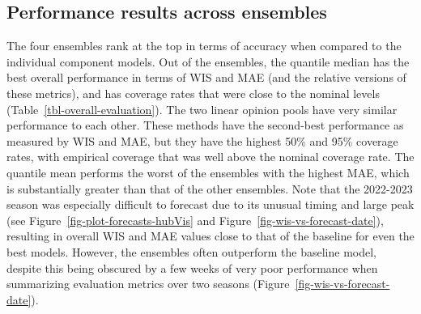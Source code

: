 \documentclass[
]{article}
\begin{document}
\subsection{Performance results across
ensembles}\label{performance-results-across-ensembles}

The four ensembles rank at the top in terms of accuracy when compared to
the individual component models. Out of the ensembles, the quantile
median has the best overall performance in terms of WIS and MAE (and the
relative versions of these metrics), and has coverage rates that were
close to the nominal levels (Table~\ref{tbl-overall-evaluation}). The
two linear opinion pools have very similar performance to each other.
These methods have the second-best performance as measured by WIS and
MAE, but they have the highest 50\% and 95\% coverage rates, with
empirical coverage that was well above the nominal coverage rate. The
quantile mean performs the worst of the ensembles with the highest MAE,
which is substantially greater than that of the other ensembles. Note
that the 2022-2023 season was especially difficult to forecast due to
its unusual timing and large peak (see
Figure~\ref{fig-plot-forecasts-hubVis} and
Figure~\ref{fig-wis-vs-forecast-date}), resulting in overall WIS and MAE
values close to that of the baseline for even the best models. However,
the ensembles often outperform the baseline model, despite this being
obscured by a few weeks of very poor performance when summarizing
evaluation metrics over two seasons
(Figure~\ref{fig-wis-vs-forecast-date}).
\end{document}
